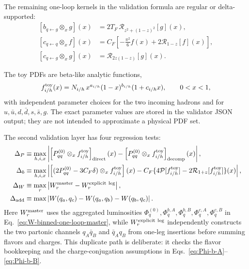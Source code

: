 \documentclass[11pt]{article}
\newcommand{\ox}{\otimes_x}
\begin{document}
The remaining one-loop kernels in the validation formula are regular or delta-supported:
\begin{align}
  \left[b_{q\leftarrow g}\ox g\right](x)
  &=2T_F\,\mathcal R_{z^2+(1-z)^2}[g](x),
  \label{eq:bqg-validator}
  \\
  \left[c_{q\leftarrow q}\ox f\right](x)
  &=
  C_F\left[-\frac{\pi^2}{6}f(x)+2\mathcal R_{1-z}[f](x)\right],
  \label{eq:cqq-validator}
  \\
  \left[c_{q\leftarrow g}\ox g\right](x)
  &=\mathcal R_{2z(1-z)}[g](x).
  \label{eq:cqg-validator}
\end{align}

The toy PDFs are beta-like analytic functions,
\begin{equation}
  f^{\rm toy}_{i/h}(x)
  =N_{i/h}\,x^{a_{i/h}}(1-x)^{b_{i/h}}(1+c_{i/h}x),
  \qquad 0<x<1,
  \label{eq:toy-pdf-beta-form}
\end{equation}
with independent parameter choices for the two incoming hadrons and for
$u,\bar u,d,\bar d,s,\bar s,g$. The exact parameter values are stored in the validator
JSON output; they are not intended to approximate a physical PDF set.

The second validation layer has four regression tests:
\begin{align}
  \Delta_{P}
  &\equiv
  \max_{h,i,x}
  \left|
  \left[P_{qq}^{(0)}\ox f^{\rm toy}_{i/h}\right]_{\rm direct}(x)
  -
  \left[P_{qq}^{(0)}\ox f^{\rm toy}_{i/h}\right]_{\rm decomp}(x)
  \right|,
  \label{eq:Delta-P-validator}
  \\
  \Delta_{b}
  &\equiv
  \max_{h,i,x}
  \left|
  \left[(2P_{qq}^{(0)}-3C_F\delta)\ox f^{\rm toy}_{i/h}\right](x)
  -
  C_F\{4\mathcal P[f^{\rm toy}_{i/h}]-2\mathcal R_{1+z}[f^{\rm toy}_{i/h}]\}(x)
  \right|,
  \label{eq:Delta-b-validator}
  \\
  \Delta_{W}
  &\equiv
  \max_{r}
  \left|W^{\rm master}_{r}-W^{\rm explicit\ leg}_{r}\right|,
  \label{eq:Delta-W-validator}
  \\
  \Delta_{\rm add}
  &\equiv
  \max\left|W(q_a,q_c)-W(q_a,q_b)-W(q_b,q_c)\right|.
  \label{eq:Delta-add-validator}
\end{align}
Here $W^{\rm master}_{r}$ uses the aggregated luminosities
$\Phi_q^{(0)},\Phi_q^{b,A},\Phi_q^{b,B},\Phi_q^{c,A},\Phi_q^{c,B}$ in
Eq.~\eqref{eq:W-binned-one-loop-master}, while $W^{\rm explicit\ leg}_{r}$ independently
constructs the two partonic channels $q_A\bar q_B$ and $\bar q_A q_B$ from one-leg
insertions before summing flavors and charges. This duplicate path is deliberate: it checks
the flavor bookkeeping and the charge-conjugation assumptions in
Eqs.~\eqref{eq:Phi-b-A}--\eqref{eq:Phi-b-B}.
\end{document}

